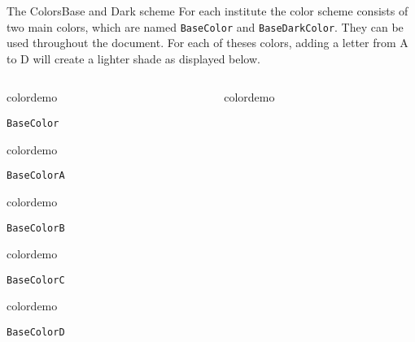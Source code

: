 \begin{frame}{The Colors}{Base and Dark scheme}
For each institute the color scheme consists of two main colors, which are named 
\texttt{BaseColor} and \texttt{BaseDarkColor}. They can be used throughout the document. For each of theses colors, adding a letter from A to D will create a lighter shade as displayed below.
%
%
%
%
%
\newdimen\bwidth
\newdimen\bheight
\newdimen\pdim
\setlength{\bwidth}{0.35\textwidth}
\setlength{\bheight}{0.5\textheight}
\setlength{\pdim}{0.05\textwidth}
\vspace{1em}%
\begin{columns}
\begin{column}{0.45\textwidth}
\begin{beamercolorbox}[dp=0pt,sep=0em,wd=\bwidth,ht=\bheight]{}
%
\begin{beamercolorbox}[sep=0em,wd=\pdim,ht=\pdim]{colordemo}%
\end{beamercolorbox}\quad\texttt{BaseColor}\newline%
%
\begin{beamercolorbox}[sep=0em,wd=\pdim,ht=\pdim]{colordemo}
\end{beamercolorbox}\quad\texttt{BaseColorA}\hfill\newline%
%
\begin{beamercolorbox}[sep=0em,wd=\pdim,ht=\pdim]{colordemo}%
\end{beamercolorbox}\quad\texttt{BaseColorB}\hfill\newline%
%
\begin{beamercolorbox}[sep=0em,wd=\pdim,ht=\pdim]{colordemo}%
\end{beamercolorbox}\quad\texttt{BaseColorC}\hfill\newline%
%
\begin{beamercolorbox}[sep=0em,wd=\pdim,ht=\pdim]{colordemo}%
\end{beamercolorbox}\quad\texttt{BaseColorD}%
\end{beamercolorbox}%
\end{column}
%
% 
%
\begin{column}{0.45\textwidth}
\begin{beamercolorbox}[dp=0pt,sep=0em,wd=\bwidth,ht=\bheight]{}
%
\begin{beamercolorbox}[sep=0em,wd=\pdim,ht=\pdim]{colordemo}%

\end{beamercolorbox}
\end{beamercolorbox}
\end{column}
\end{columns}
\end{frame}
